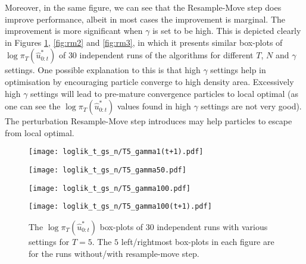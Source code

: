Moreover, in the same figure, we can see that the Resample-Move step does improve performance, albeit in most cases the improvement is marginal. The improvement is more significant when $\gamma$ is set to be high. This is depicted clearly in Figures \ref{fig:rm1}, \ref{fig:rm2} and \ref{fig:rm3}, in which it presents similar box-plots of $\log\pi_T(\hat{u}^*_{0:t})$ of $30$ independent runs of the algorithms for different $T$, $N$ and $\gamma$ settings. One possible explanation to this is that high $\gamma$ settings help in optimisation by encouraging particle converge to high density area. Excessively high $\gamma$ settings will lead to pre-mature convergence particles to local optimal (as one can see the $\log\pi_T(\hat{u}^*_{0:t})$ values found in high $\gamma$ settings are not very good). The perturbation Resample-Move step introduces may help particles to escape from local optimal.

\begin{figure}[!thbp]
    \centering
    \begin{minipage}{.5\textwidth}
        \centering
        \texttt{[image: loglik\_t\_gs\_n/T5\_gamma1(t+1).pdf]}
    \end{minipage}%
    \begin{minipage}{0.5\textwidth}
        \centering
        \texttt{[image: loglik\_t\_gs\_n/T5\_gamma50.pdf]}
    \end{minipage}
    \begin{minipage}{0.5\textwidth}
        \centering
        \texttt{[image: loglik\_t\_gs\_n/T5\_gamma100.pdf]}
    \end{minipage}%
    \begin{minipage}{0.5\textwidth}
        \centering
        \texttt{[image: loglik\_t\_gs\_n/T5\_gamma100(t+1).pdf]}
    \end{minipage}
    \caption{The $\log\pi_T(\hat{u}^*_{0:t})$ box-plots of 30 independent runs with various settings for $T=5$. The $5$ left/rightmost box-plots in each figure are for the runs without/with resample-move step.}
    \label{fig:rm1}
\end{figure}

